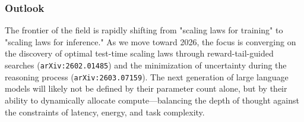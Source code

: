 \documentclass[11pt]{article}
\begin{document}
\subsubsection{Outlook}

The frontier of the field is rapidly shifting from "scaling laws for training" to "scaling laws for inference." As we move toward 2026, the focus is converging on the discovery of optimal test-time scaling laws through reward-tail-guided searches (\texttt{arXiv:2602.01485}) and the minimization of uncertainty during the reasoning process (\texttt{arXiv:2603.07159}). The next generation of large language models will likely not be defined by their parameter count alone, but by their ability to dynamically allocate compute—balancing the depth of thought against the constraints of latency, energy, and task complexity.
\end{document}
